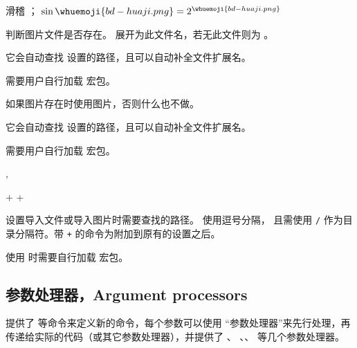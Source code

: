 \documentclass{whudoc}
\begin{document}
\begin{xample}
\newcommand{\bdhj}{}
滑稽 \bdhj ； $ \sin\bdhj = 2^\bdhj $
\stopxamplecode
\xampleprint
\end{xample}

\begin{function}{\IfGraphicsExists}
  \begin{syntax}
    \V\IfGraphicsExists {}  
  \end{syntax}
判断图片文件是否存在。 展开为此文件名，若无此文件则为 。

它会自动查找  设置的路径，且可以自动补全文件扩展名。

需要用户自行加载  宏包。
\end{function}

\begin{function}{\InputIfGraphicsExists}
  \begin{syntax}
    \V\InputIfGraphicsExists *  
  \end{syntax}
如果图片存在时使用图片，否则什么也不做。

它会自动查找  设置的路径，且可以自动补全文件扩展名。

需要用户自行加载  宏包。
\end{function}

\begin{function}{\setinputpath,\setgraphicspath}
  \begin{syntax}
    \V\setinputpath      {}
    \V\setinputpath    + 
    \V\setgraphicspath   {}
    \V\setgraphicspath + 
  \end{syntax}
设置导入文件或导入图片时需要查找的路径。 使用逗号分隔，
且需使用 \texttt/ 作为目录分隔符。带 \texttt+ 的命令为附加到原有的设置之后。

使用  时需要自行加载  宏包。
\end{function}

\subsection{参数处理器，Argument processors}

 提供了  等命令来定义新的命令，每个参数可以使用
“参数处理器”来先行处理，再传递给实际的代码（或其它参数处理器），并提供了 、
\cmd\SplitArgument、\cmd\SplitList、 等几个参数处理器。
\end{document}
